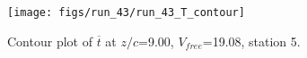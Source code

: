 \begin{figure}[H]
\centering
\texttt{[image: figs/run\_43/run\_43\_T\_contour]}
\caption{Contour plot of $\overline{t}$ at $z/c$=9.00, $V_{free}$=19.08, station 5.}
\label{fig:run_43_T_contour}
\end{figure}


